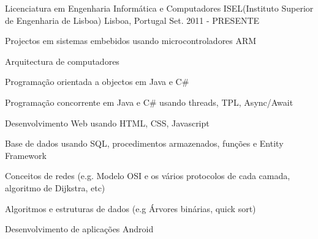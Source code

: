 


\begin{cventries}


\cventry
{Licenciatura em Engenharia Informática e Computadores} %
{ISEL(Instituto Superior de Engenharia de Lisboa)} %
{Lisboa, Portugal} %
{Set. 2011 - PRESENTE} %
{ %
\begin{cvitems}
\item {Projectos em sistemas embebidos usando microcontroladores ARM}
\item {Arquitectura de computadores}
\item {Programação orientada a objectos em Java e C\#}
\item {Programação concorrente em Java e C\# usando threads, TPL, Async/Await}
\item {Desenvolvimento Web usando HTML, CSS, Javascript}
\item {Base de dados usando SQL, procedimentos armazenados, funções e Entity Framework}
\item {Conceitos de redes (e.g. Modelo OSI e os vários protocolos de cada camada, algoritmo de Dijkstra, etc)}
\item {Algoritmos e estruturas de dados (e.g Árvores binárias, quick sort)}
\item {Desenvolvimento de aplicações Android}
\end{cvitems}
}


\end{cventries}